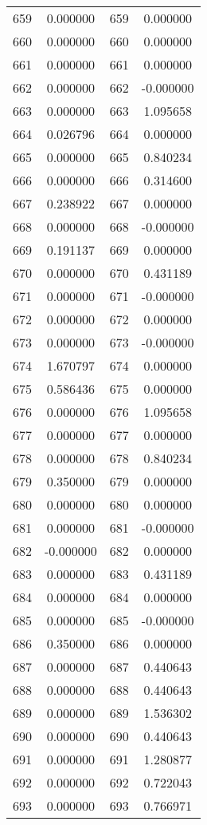 \documentclass[12pt]{article}
\begin{document}
\begin{longtable}{@{}cccc@{}}
659 & 0.000000 & 659 & 0.000000 \\
660 & 0.000000 & 660 & 0.000000 \\
661 & 0.000000 & 661 & 0.000000 \\
662 & 0.000000 & 662 & -0.000000 \\
663 & 0.000000 & 663 & 1.095658 \\
664 & 0.026796 & 664 & 0.000000 \\
665 & 0.000000 & 665 & 0.840234 \\
666 & 0.000000 & 666 & 0.314600 \\
667 & 0.238922 & 667 & 0.000000 \\
668 & 0.000000 & 668 & -0.000000 \\
669 & 0.191137 & 669 & 0.000000 \\
670 & 0.000000 & 670 & 0.431189 \\
671 & 0.000000 & 671 & -0.000000 \\
672 & 0.000000 & 672 & 0.000000 \\
673 & 0.000000 & 673 & -0.000000 \\
674 & 1.670797 & 674 & 0.000000 \\
675 & 0.586436 & 675 & 0.000000 \\
676 & 0.000000 & 676 & 1.095658 \\
677 & 0.000000 & 677 & 0.000000 \\
678 & 0.000000 & 678 & 0.840234 \\
679 & 0.350000 & 679 & 0.000000 \\
680 & 0.000000 & 680 & 0.000000 \\
681 & 0.000000 & 681 & -0.000000 \\
682 & -0.000000 & 682 & 0.000000 \\
683 & 0.000000 & 683 & 0.431189 \\
684 & 0.000000 & 684 & 0.000000 \\
685 & 0.000000 & 685 & -0.000000 \\
686 & 0.350000 & 686 & 0.000000 \\
687 & 0.000000 & 687 & 0.440643 \\
688 & 0.000000 & 688 & 0.440643 \\
689 & 0.000000 & 689 & 1.536302 \\
690 & 0.000000 & 690 & 0.440643 \\
691 & 0.000000 & 691 & 1.280877 \\
692 & 0.000000 & 692 & 0.722043 \\
693 & 0.000000 & 693 & 0.766971 \\

\end{longtable}
\end{document}
